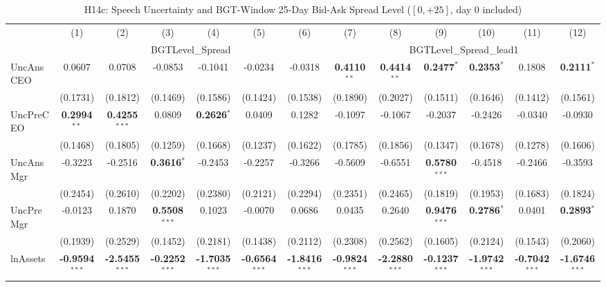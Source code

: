 \begin{landscape}
\begin{table}[H]
\setlength{\tabcolsep}{3pt}
\renewcommand{\arraystretch}{0.85}
\centering
\caption{H14c: Speech Uncertainty and BGT-Window 25-Day Bid-Ask Spread Level ($[0,+25]$, day 0 included)}
\label{tab:h14c}
\scriptsize
\begin{tabular}{lcccccccccccc}
\toprule
 & (1) & (2) & (3) & (4) & (5) & (6) & (7) & (8) & (9) & (10) & (11) & (12) \\
 & \multicolumn{6}{c}{BGTLevel\_Spread} & \multicolumn{6}{c}{BGTLevel\_Spread\_lead1} \\
\cmidrule(lr){2-7} \cmidrule(lr){8-13}
\midrule
UncAnsCEO & 0.0607 & 0.0708 & -0.0853 & -0.1041 & -0.0234 & -0.0318 & \textbf{0.4110}$^{**}$ & \textbf{0.4414}$^{**}$ & \textbf{0.2477}$^{*}$ & \textbf{0.2353}$^{*}$ & 0.1808 & \textbf{0.2111}$^{*}$ \\
 & (0.1731) & (0.1812) & (0.1469) & (0.1586) & (0.1424) & (0.1538) & (0.1890) & (0.2027) & (0.1511) & (0.1646) & (0.1412) & (0.1561) \\
UncPreCEO & \textbf{0.2994}$^{**}$ & \textbf{0.4255}$^{***}$ & 0.0809 & \textbf{0.2626}$^{*}$ & 0.0409 & 0.1282 & -0.1097 & -0.1067 & -0.2037 & -0.2426 & -0.0340 & -0.0930 \\
 & (0.1468) & (0.1805) & (0.1259) & (0.1668) & (0.1237) & (0.1622) & (0.1785) & (0.1856) & (0.1347) & (0.1678) & (0.1278) & (0.1606) \\
UncAnsMgr & -0.3223 & -0.2516 & \textbf{0.3616}$^{*}$ & -0.2453 & -0.2257 & -0.3266 & -0.5609 & -0.6551 & \textbf{0.5780}$^{***}$ & -0.4518 & -0.2466 & -0.3593 \\
 & (0.2454) & (0.2610) & (0.2202) & (0.2380) & (0.2121) & (0.2294) & (0.2351) & (0.2465) & (0.1819) & (0.1953) & (0.1683) & (0.1824) \\
UncPreMgr & -0.0123 & 0.1870 & \textbf{0.5508}$^{***}$ & 0.1023 & -0.0070 & 0.0686 & 0.0435 & 0.2640 & \textbf{0.9476}$^{***}$ & \textbf{0.2786}$^{*}$ & 0.0401 & \textbf{0.2893}$^{*}$ \\
 & (0.1939) & (0.2529) & (0.1452) & (0.2181) & (0.1438) & (0.2112) & (0.2308) & (0.2562) & (0.1605) & (0.2124) & (0.1543) & (0.2060) \\
\midrule
lnAssets & \textbf{-0.9594}$^{***}$ & \textbf{-2.5455}$^{***}$ & \textbf{-0.2252}$^{***}$ & \textbf{-1.7035}$^{***}$ & \textbf{-0.6564}$^{***}$ & \textbf{-1.8416}$^{***}$ & \textbf{-0.9824}$^{***}$ & \textbf{-2.2880}$^{***}$ & \textbf{-0.1237}$^{***}$ & \textbf{-1.9742}$^{***}$ & \textbf{-0.7042}$^{***}$ & \textbf{-1.6746}$^{***}$ \\

\end{tabular}
\end{table}
\end{landscape}

